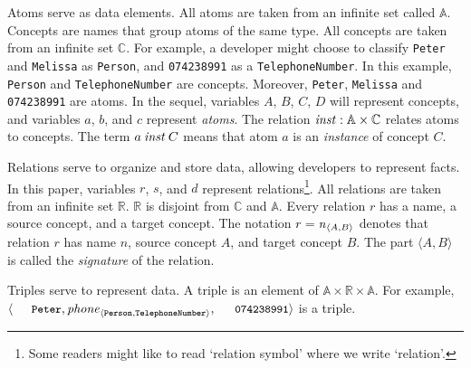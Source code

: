 \documentclass[runningheads]{llncs}
\newcommand{\id}[1]{\text{\it #1\/}}
\newcommand{\instance}{\mathbin{\id{inst}}}
\newcommand{\declare}[3]{\id{#1}_{\pair{#2}{#3}}}
\newcommand{\pair}[2]{\langle{#1},{#2}\rangle}
\newcommand{\Pair}[2]{#1\times#2}
\newcommand{\triple}[3]{\langle{#1},{#2},{#3}\rangle}
\newcommand{\atom}[1]{{\tt\small #1}}
\newcommand{\Atoms}{\mathbb{A}}
\newcommand{\concept}[1]{{\tt\small #1}}
\newcommand{\Concepts}{\mathbb{C}}
\newcommand{\Rels}{\mathbb{R}}   %
\newcommand{\Triple}[3]{#1\times#2\times#3}
\begin{document}
   Atoms serve as data elements.
   All atoms are taken from an infinite set called $\Atoms$.
   Concepts are names that group atoms of the same type.
   All concepts are taken from an infinite set $\Concepts$.
   For example, a developer might choose to classify \atom{Peter} and \atom{Melissa} as \concept{Person},
   and \atom{074238991} as a \concept{TelephoneNumber}.
   In this example, \concept{Person} and \concept{TelephoneNumber} are concepts.
   Moreover, \atom{Peter}, \atom{Melissa} and \atom{074238991} are atoms.
   In the sequel, variables $A$, $B$, $C$, $D$ will represent concepts, and variables $a$, $b$, and $c$ represent \emph{atoms}.
   The relation $\instance:\Pair{\Atoms}{\Concepts}$ relates atoms to concepts.
   The term $a\instance C$ means that atom $a$ is an \emph{instance} of concept $C$.

   Relations serve to organize and store data, allowing developers to represent facts.
   In this paper, variables $r$, $s$, and $d$ represent relations\footnote{Some readers might like to read `relation symbol' where we write `relation'.}.
   All relations are taken from an infinite set $\Rels$.
   $\Rels$ is disjoint from $\Concepts$ and $\Atoms$.
   Every relation $r$ has a name, a source concept, and a target concept.
   The notation $r=\declare{n}{A}{B}$ denotes that relation $r$ has name $n$, source concept $A$, and target concept $B$.
   The part $\pair{A}{B}$ is called the {\em signature} of the relation.
   
   Triples serve to represent data.
   A triple %
   is an element of $\Triple{\Atoms}{\Rels}{\Atoms}$.
   For example, $\triple{\text{\atom{Peter}}}{\declare{\id{phone}}{\tt Person}{\tt TelephoneNumber}}{\text{\atom{074238991}}}$ is a triple.
   
\end{document}
